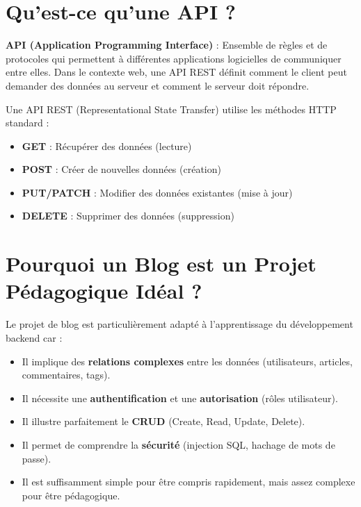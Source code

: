 \documentclass[a4paper,12pt]{book}
\begin{document}
\section{Qu'est-ce qu'une API ?}

\begin{definitionbox}
    \textbf{API (Application Programming Interface)} : Ensemble de règles et de protocoles qui permettent à différentes applications logicielles de communiquer entre elles. Dans le contexte web, une API REST définit comment le client peut demander des données au serveur et comment le serveur doit répondre.
\end{definitionbox}

Une API REST (Representational State Transfer) utilise les méthodes HTTP standard :
\begin{itemize}
    \item \textbf{GET} : Récupérer des données (lecture)
    \item \textbf{POST} : Créer de nouvelles données (création)
    \item \textbf{PUT/PATCH} : Modifier des données existantes (mise à jour)
    \item \textbf{DELETE} : Supprimer des données (suppression)
\end{itemize}

\section{Pourquoi un Blog est un Projet Pédagogique Idéal ?}

Le projet de blog est particulièrement adapté à l'apprentissage du développement backend car :

\begin{itemize}
    \item Il implique des \textbf{relations complexes} entre les données (utilisateurs, articles, commentaires, tags).
    \item Il nécessite une \textbf{authentification} et une \textbf{autorisation} (rôles utilisateur).
    \item Il illustre parfaitement le \textbf{CRUD} (Create, Read, Update, Delete).
    \item Il permet de comprendre la \textbf{sécurité} (injection SQL, hachage de mots de passe).
    \item Il est suffisamment simple pour être compris rapidement, mais assez complexe pour être pédagogique.
\end{itemize}
\end{document}
